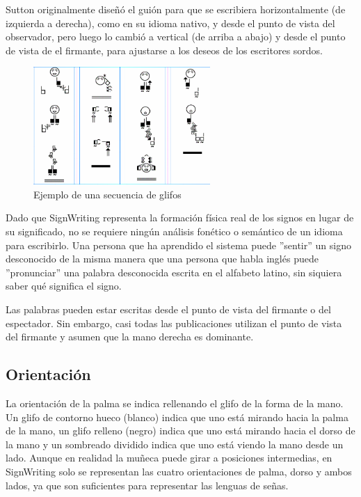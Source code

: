  Sutton originalmente diseñó el guión para que se escribiera horizontalmente (de izquierda a derecha), como en su idioma nativo, y desde el punto de vista del observador, pero luego lo cambió a vertical (de arriba a abajo) y desde el punto de vista de el firmante, para ajustarse a los deseos de los escritores sordos.
 \begin{figure}[ht!]
    \centering
    \includegraphics[width=0.6\textwidth]{Graphics/arreglo_glifos_sutton.png}
    \caption{Ejemplo de una secuencia de glifos}
    \label{fig:arreglo_glifos_sutton}
\end{figure}
 
 Dado que SignWriting representa la formación física real de los signos en lugar de su significado, no se requiere ningún análisis fonético o semántico de un idioma para escribirlo. Una persona que ha aprendido el sistema puede ''sentir'' un signo desconocido de la misma manera que una persona que habla inglés puede ''pronunciar'' una palabra desconocida escrita en el alfabeto latino, sin siquiera saber qué significa el signo.

Las palabras pueden estar escritas desde el punto de vista del firmante o del espectador. Sin embargo, casi todas las publicaciones utilizan el punto de vista del firmante y asumen que la mano derecha es dominante.

\subsection{Orientación}\label{subsection:state-of-the-art:sl:orientation}
La orientación de la palma se indica rellenando el glifo de la forma de la mano. Un glifo de contorno hueco (blanco) indica que uno está mirando hacia la palma de la mano, un glifo relleno (negro) indica que uno está mirando hacia el dorso de la mano y un sombreado dividido indica que uno está viendo la mano desde un lado. Aunque en realidad la muñeca puede girar a posiciones intermedias, en SignWriting solo se representan las cuatro orientaciones de palma, dorso y ambos lados, ya que son suficientes para representar las lenguas de señas.

